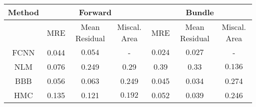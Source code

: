 \documentclass[convert={outext=.png}]{standalone}
\begin{document}
\centering
\label{tab:experimental_results}



\begin{tabular}{c c c c c c c}
\hline
\hline
Method &  \multicolumn{3}{c}{Forward} & \multicolumn{3}{c}{Bundle} \\ \hline
 & MRE & Mean Residual & Miscal. Area & MRE & Mean Residual & Miscal. Area\\
 FCNN & 0.044 & $\mathbf{0.054}$ & - & $\mathbf{0.024}$ & $\mathbf{0.027}$ & - \\
 \hline
 NLM & 0.076 & 0.249 & 0.29 & 0.39 & 0.33 & $\mathbf{0.136}$ \\
 BBB & 0.056 & 0.063 & 0.249 & 0.045 & 0.034 & 0.274 \\
 HMC & 0.135 & 0.121 & $\mathbf{0.192}$ & 0.052 & 0.039 & 0.246 \\
\hline
\hline
\end{tabular}
\end{document}
